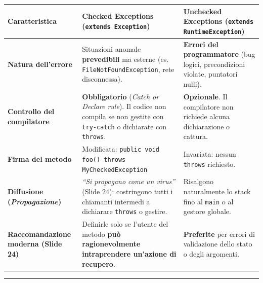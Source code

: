 \documentclass[11pt,a4paper,oneside]{report}
\newcommand{\passthrough}[1]{#1}
\begin{document}
\begin{longtable}[]{@{}
  >{\raggedright\arraybackslash}p{}
  >{\raggedright\arraybackslash}p{}
  >{\raggedright\arraybackslash}p{}@{}}
\toprule\noalign{}
\begin{minipage}[b]{\linewidth}\raggedright
Caratteristica
\end{minipage} & \begin{minipage}[b]{\linewidth}\raggedright
Checked Exceptions (\passthrough{\lstinline!extends Exception!})
\end{minipage} & \begin{minipage}[b]{\linewidth}\raggedright
Unchecked Exceptions
(\passthrough{\lstinline!extends RuntimeException!})
\end{minipage} \\
\midrule\noalign{}
\endhead
\bottomrule\noalign{}
\endlastfoot
\textbf{Natura dell'errore} & Situazioni anomale \textbf{prevedibili} ma
esterne (es. \passthrough{\lstinline!FileNotFoundException!}, rete
disconnessa). & \textbf{Errori del programmatore} (bug logici,
precondizioni violate, puntatori nulli). \\
\textbf{Controllo del compilatore} & \textbf{Obbligatorio} (\emph{Catch
or Declare rule}). Il codice non compila se non gestite con
\passthrough{\lstinline!try-catch!} o dichiarate con
\passthrough{\lstinline!throws!}. & \textbf{Opzionale}. Il compilatore
non richiede alcuna dichiarazione o cattura. \\
\textbf{Firma del metodo} & Modificata:
\passthrough{\lstinline!public void foo() throws MyCheckedException!} &
Invariata: nessun \passthrough{\lstinline!throws!} richiesto. \\
\textbf{Diffusione (\emph{Propagazione})} & \emph{``Si propagano come un
virus''} (Slide 24): costringono tutti i chiamanti intermedi a
dichiarare \passthrough{\lstinline!throws!} o gestire. & Risalgono
naturalmente lo stack fino al \passthrough{\lstinline!main!} o al
gestore globale. \\
\textbf{Raccomandazione moderna (Slide 24)} & Definirle solo se l'utente
del metodo \textbf{può ragionevolmente intraprendere un'azione di
recupero}. & \textbf{Preferite} per errori di validazione dello stato o
degli argomenti. \\
\end{longtable}

\begin{center}\rule{0.5\linewidth}{0.5pt}\end{center}
\end{document}
